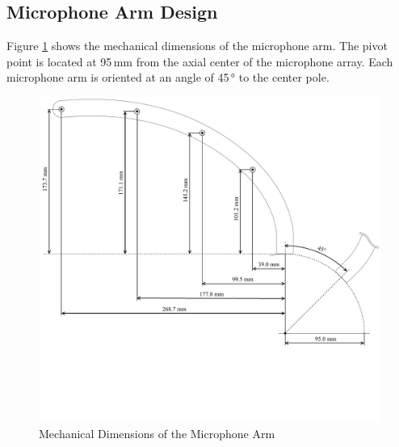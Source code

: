 \subsection{Microphone Arm Design}
Figure \ref{fig:mechanical_dimensions_microphone_arm} shows the mechanical dimensions of the microphone arm.
The pivot point is located at 95\,mm from the axial center of the microphone array.
Each microphone arm is oriented at an angle of 45\,° to the center pole.
\begin{figure}[h!]
	\centering
	\includegraphics[width=1.0\textwidth, trim={0 4.9cm 0 0}]{images/6_design_final/array_final_design_mechanical_dimensions.pdf}
	\caption{Mechanical Dimensions of the Microphone Arm}
	\label{fig:mechanical_dimensions_microphone_arm}
\end{figure}
\pagebreak

